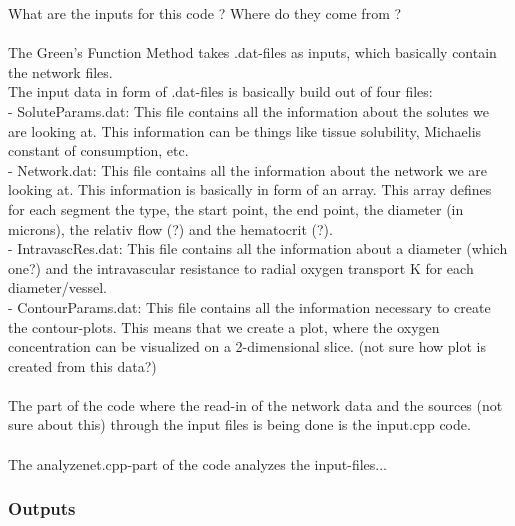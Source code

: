What are the inputs for this code ? Where do they come from ?
\\
\\The Green's Function Method takes .dat-files as inputs, which basically contain the network files.
\\
The input data in form of .dat-files is basically build out of four files:
\\- SoluteParams.dat: This file contains all the information about the solutes we are looking at. This information can be things like tissue solubility, Michaelis constant of consumption, etc.
\\- Network.dat: This file contains all the information about the network we are looking at. This information is basically in form of an array. This array defines for each segment the type, the start point, the end point, the diameter (in microns), the relativ flow (?) and the hematocrit (?).
\\- IntravascRes.dat: This file contains all the information about a diameter (which one?) and the intravascular resistance to radial oxygen transport K for each diameter/vessel.
\\- ContourParams.dat: This file contains all the information necessary to create the contour-plots. This means that we create a plot, where the oxygen concentration can be visualized on a 2-dimensional slice. (not sure how plot is created from this data?)
\\
\\The part of the code where the read-in of the network data and the sources (not sure about this) through the input files is being done is the input.cpp code.
\\
\\The analyzenet.cpp-part of the code analyzes the input-files...

\subsubsection*{Outputs}
\label{Outputs}

